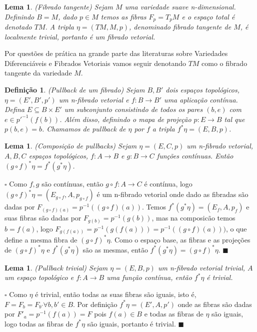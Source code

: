 \documentclass[12pt]{book}
\newtheorem{lema}[teorema]{Lema}
\newtheorem{definicao}[teorema]{Definição}
\newenvironment{prova}[1]{$\square$ #1}{\hfill$\blacksquare$}
\begin{document}
	\begin{lema}
		(Fibrado tangente) Sejam $M$ uma variedade suave n-dimensional. Definindo $B=M$, dado $p\in M$ temos as fibras $F_{p} = T_{p}M$ e o espaço total é denotado $TM$. A tripla $\eta = (TM, M, p)$, denominado fibrado tangente de $M$, é localmente trivial, portanto é um fibrado vetorial.
	\end{lema}
	
	Por questões de prática na grande parte das literaturas sobre Variedades Diferenciáveis e Fibrados Vetoriais vamos seguir denotando $TM$ como o fibrado tangente da variedade $M$.
	
	\begin{definicao}
		(Pullback de um fibrado) Sejam $B, B'$ dois espaços topológicos, $\eta=(E', B', p')$ um n-fibrado vetorial e $f:B\to B'$ uma aplicação contínua. Defina $E \subseteq B\times E'$ um subconjunto consistindo de todos os pares $(b, e)$ com $e\in p'^{-1}(f(b))$. Além disso, definindo o mapa de projeção $p:E\to B$ tal que $p(b,e) = b$. Chamamos de pullback de $\eta$ por $f$ a tripla $f^{*}\eta = (E,B, p)$.
	\end{definicao}
	
	\begin{lema}\label{pullback_composicao}
		(Composição de pullbacks) Sejam $\eta =(E, C, p)$ um n-fibrado vetorial, $A, B, C$ espaços topológicos, $f:A\to B$ e $g:B\to C$ funções contínuas. Então $(g\circ f)^{*} \eta= f^{*}(g^{*}\eta)$.
	\end{lema}
	\begin{prova}
		Como $f, g$ são contínuas, então $g\circ f:A\to C$ é contínua, logo $(g\circ f)^{*}\eta = (E_{g\circ f}, A, p_{g\circ f})$ é um n-fibrado vetorial onde dado as fibradas são dadas por $F_{(g\circ f)(a)} = p^{-1}((g\circ f)(a))$. Temos $f^{*}(g^{*}\eta) = (E_{f}, A, p_{f})$ e suas fibras são dadas por $F_{g(b)} = p^{-1}(g(b))$, mas na composicão temos $b=f(a)$, logo  $F_{g(f(a))} = p^{-1}(g(f(a))) = p^{-1}((g \circ f)(a)))$, o que define a mesma fibra de $(g\circ f)^{*}\eta$. Como o espaço base, as fibras e as projeções de $(g\circ f)^{*}\eta$ e $f^{*}(g^{*}\eta)$ são as mesmas, então $f^{*}(g^{*}\eta) = (g\circ f)^{*}\eta$.
	\end{prova}
	\begin{lema}\label{pullback_trivial}
		(Pullback trivial) Sejam $\eta = (E, B, p)$ um n-fibrado vetorial trivial, $A$ um espaço topológico e $f:A\to B$ uma função contínua, então $f^{*}\eta$ é trivial.
	\end{lema}
	\begin{prova}
		Como $\eta$ é trivial, então todas as suas fibras são iguais, isto é, $F=F_{b} = F_{b'} \forall b, b' \in B$. Por definição $f^{*}\eta = (E', A, p')$ onde as fibras são dadas por $F'_{a} = p^{-1}(f(a)) = F$ pois $f(a) \in B$ e todas as fibras de $\eta$ são iguais, logo todas as fibras de $f^{*}\eta$ são iguais, portanto é trivial.
	\end{prova}
	
\end{document}
